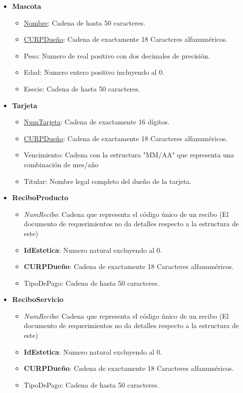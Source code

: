 \documentclass{exam}
\begin{document}
\begin{itemize}
	\item \textbf{Mascota}
		\begin{itemize}
			\item \underline{Nombre}: Cadena de hasta 50 caracteres.
			\item \underline{CURPDueño}: Cadena de exactamente 18 Caracteres alfanuméricos.
			\item Peso: Numero de real positivo con dos decimales de precisión.
			\item Edad:  Numero entero positivo incluyendo al 0.
			\item Esecie: Cadena de hasta 50 caracteres.
		\end{itemize}
		
	\item \textbf{Tarjeta}
		\begin{itemize}
			\item \underline{NumTarjeta}: Cadena de exactamente 16 dígitos.
			\item \underline{CURPDueño}: Cadena de exactamente 18 Caracteres alfanuméricos.
			\item Vencimiento: Cadena con la estructura "MM/AA" que representa una combinación de mes/año
			\item Titular: Nombre legal completo del dueño de la tarjeta.
		\end{itemize}
		
	\item \textbf{ReciboProducto}
		\begin{itemize}
			\item \textit{NumRecibo}: Cadena que representa el código único de un recibo (El documento de requerimientos no da detalles respecto a la estructura de este)
			\item \textbf{IdEstetica}: Numero natural excluyendo al 0.
			\item \textbf{CURPDueño}: Cadena de exactamente 18 Caracteres alfanuméricos.
			\item TipoDePago: Cadena de hasta 50 caracteres.
		\end{itemize}	
		
	\item \textbf{ReciboServicio}
		\begin{itemize}
			\item \textit{NumRecibo}: Cadena que representa el código único de un recibo (El documento de requerimientos no da detalles respecto a la estructura de este)
			\item \textbf{IdEstetica}: Numero natural excluyendo al 0.
			\item \textbf{CURPDueño}: Cadena de exactamente 18 Caracteres alfanuméricos.
			\item TipoDePago: Cadena de hasta 50 caracteres.
		\end{itemize}
		

\end{itemize}
\end{document}

